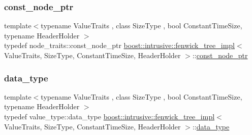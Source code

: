 \mbox{\label{classboost_1_1intrusive_1_1fenwick__tree__impl_a2c2dc37954c7b844f875adecb7d668a1}} 
\subsubsection{\texorpdfstring{const\+\_\+node\+\_\+ptr}{const\_node\_ptr}}
{\footnotesize\ttfamily template$<$typename Value\+Traits , class Size\+Type , bool Constant\+Time\+Size, typename Header\+Holder $>$ \\
typedef node\+\_\+traits\+::const\+\_\+node\+\_\+ptr \hyperlink{classboost_1_1intrusive_1_1fenwick__tree__impl}{boost\+::intrusive\+::fenwick\+\_\+tree\+\_\+impl}$<$ Value\+Traits, Size\+Type, Constant\+Time\+Size, Header\+Holder $>$\+::\hyperlink{classboost_1_1intrusive_1_1fenwick__tree__impl_a2c2dc37954c7b844f875adecb7d668a1}{const\+\_\+node\+\_\+ptr}}

\mbox{\label{classboost_1_1intrusive_1_1fenwick__tree__impl_acc226a36fd0f4814574917193e0c59ef}} 
\subsubsection{\texorpdfstring{data\+\_\+type}{data\_type}}
{\footnotesize\ttfamily template$<$typename Value\+Traits , class Size\+Type , bool Constant\+Time\+Size, typename Header\+Holder $>$ \\
typedef value\+\_\+type\+::data\+\_\+type \hyperlink{classboost_1_1intrusive_1_1fenwick__tree__impl}{boost\+::intrusive\+::fenwick\+\_\+tree\+\_\+impl}$<$ Value\+Traits, Size\+Type, Constant\+Time\+Size, Header\+Holder $>$\+::\hyperlink{classboost_1_1intrusive_1_1fenwick__tree__impl_acc226a36fd0f4814574917193e0c59ef}{data\+\_\+type}}

\mbox{\label{classboost_1_1intrusive_1_1fenwick__tree__impl_ae20783e43141c54fd66b9b0c582ed94a}} 
